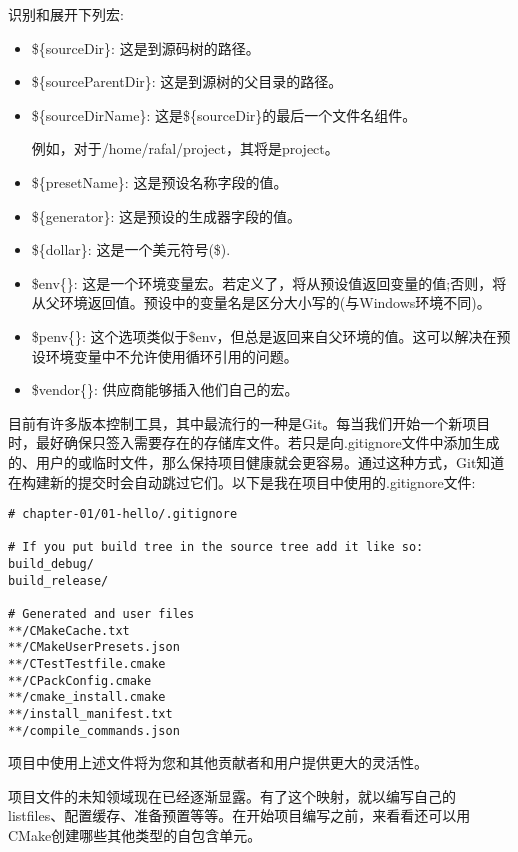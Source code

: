 识别和展开下列宏:

\begin{itemize}
\item 
\$\{sourceDir\}: 这是到源码树的路径。

\item 
\$\{sourceParentDir\}: 这是到源树的父目录的路径。

\item 
\$\{sourceDirName\}: 这是\$\{sourceDir\}的最后一个文件名组件。

例如，对于/home/rafal/project，其将是project。

\item 
\$\{presetName\}: 这是预设名称字段的值。

\item 
\$\{generator\}: 这是预设的生成器字段的值。

\item 
\$\{dollar\}: 这是一个美元符号(\$).

\item 
\$env\{<variable-name>\}: 这是一个环境变量宏。若定义了，将从预设值返回变量的值;否则，将从父环境返回值。预设中的变量名是区分大小写的(与Windows环境不同)。

\item 
\$penv\{<variable-name>\}: 这个选项类似于\$env，但总是返回来自父环境的值。这可以解决在预设环境变量中不允许使用循环引用的问题。

\item 
\$vendor\{<macro-name>\}: 供应商能够插入他们自己的宏。
\end{itemize}



目前有许多版本控制工具，其中最流行的一种是Git。每当我们开始一个新项目时，最好确保只签入需要存在的存储库文件。若只是向.gitignore文件中添加生成的、用户的或临时文件，那么保持项目健康就会更容易。通过这种方式，Git知道在构建新的提交时会自动跳过它们。以下是我在项目中使用的.gitignore文件:

\begin{lstlisting}[style=styleCMake]	
# chapter-01/01-hello/.gitignore
	
# If you put build tree in the source tree add it like so:
build_debug/
build_release/

# Generated and user files
**/CMakeCache.txt
**/CMakeUserPresets.json
**/CTestTestfile.cmake
**/CPackConfig.cmake
**/cmake_install.cmake
**/install_manifest.txt
**/compile_commands.json
\end{lstlisting}

项目中使用上述文件将为您和其他贡献者和用户提供更大的灵活性。

项目文件的未知领域现在已经逐渐显露。有了这个映射，就以编写自己的listfiles、配置缓存、准备预置等等。在开始项目编写之前，来看看还可以用CMake创建哪些其他类型的自包含单元。










